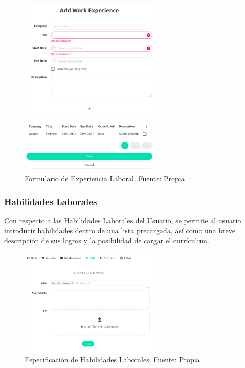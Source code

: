 \begin{figure}[H]
\centering
\includegraphics[width=0.60\textwidth]{img/25.png}
\caption{Formulario de Experiencia Laboral. Fuente: Propia}
\label{figure:usersWorkForm}
\end{figure}

\subsubsection{Habilidades Laborales}

Con respecto a las Habilidades Laborales del Usuario, se permite al usuario introducir habilidades dentro de una lista precargada, así como una breve descripción de sus logros y la posibilidad de cargar el currículum.

\begin{figure}[H]
\centering
\includegraphics[width=0.60\textwidth]{img/26.png}
\caption{Especificación de Habilidades Laborales. Fuente: Propia}
\label{figure:usersWorkSkills}
\end{figure}


